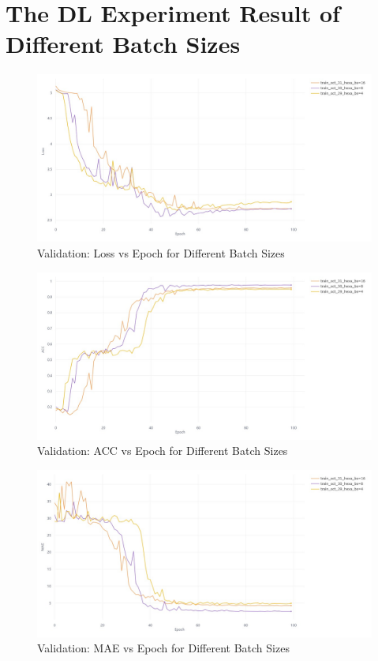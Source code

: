 \section*{The DL Experiment Result of Different Batch Sizes}
\begin{figure}[H]
    \centering
    \includegraphics[width=1\linewidth]{figures/BS Valid_ Loss VS epoch.jpeg}
    \caption{Validation: Loss vs Epoch for Different Batch Sizes}
\end{figure}
\begin{figure}[H]
    \centering
    \includegraphics[width=1\linewidth]{figures/BS Valid_ ACC VS epoch.jpeg}
    \caption{Validation: ACC vs Epoch for Different Batch Sizes}
\end{figure}
\begin{figure}[H]
    \centering
    \includegraphics[width=1\linewidth]{figures/BS Valid_ MAE VS epoch.jpeg}
    \caption{Validation: MAE vs Epoch for Different Batch Sizes}
\end{figure}

